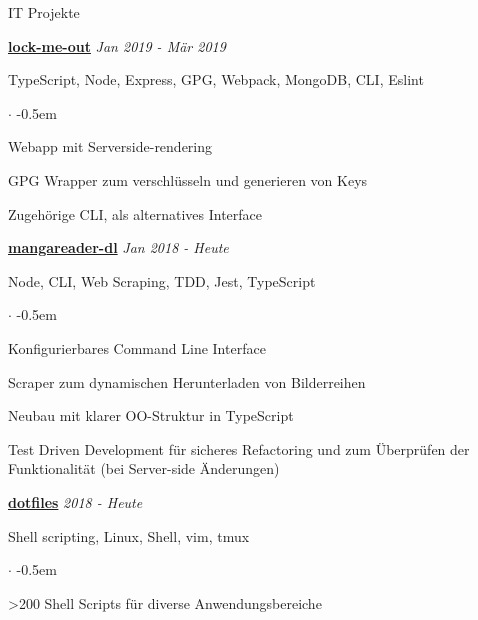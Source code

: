 \documentclass{cv}
\begin{document}
\begin{rSection}{IT Projekte}


  \textbf{\href{https://github.com/jneidel/lock-me-out}{lock-me-out}}
  \hfill
  {\em Jan 2019 - Mär 2019}

  TypeScript, Node, Express, GPG, Webpack, MongoDB, CLI, Eslint
  \begin{list}{$\cdot$}{}
    \itemsep -0.5em \vspace{-0.5em}
    \smallskip
    \item Webapp mit Serverside-rendering
    \item GPG Wrapper zum verschlüsseln und generieren von Keys
    \item Zugehörige CLI, als alternatives Interface
  \end{list}

  \textbf{\href{https://github.com/jneidel/mangareader-dl}{mangareader-dl}}
  \hfill
  {\em Jan 2018 - Heute}

  Node, CLI, Web Scraping, TDD, Jest, TypeScript
  \begin{list}{$\cdot$}{}
    \itemsep -0.5em \vspace{-0.5em}
    \smallskip
    \item Konfigurierbares Command Line Interface
    \item Scraper zum dynamischen Herunterladen von Bilderreihen
    \item Neubau mit klarer OO-Struktur in TypeScript
    \item Test Driven Development für sicheres Refactoring und zum Überprüfen der
  Funktionalität (bei Server-side Änderungen)
  \end{list}

  \textbf{\href{https://github.com/jneidel/dotfiles}{dotfiles}}
  \hfill
  {\em 2018 - Heute}

  Shell scripting, Linux, Shell, vim, tmux
  \begin{list}{$\cdot$}{}
    \itemsep -0.5em \vspace{-0.5em}
    \smallskip
    \item \textgreater200 Shell Scripts für diverse Anwendungsbereiche
  \end{list}


\end{rSection}
\end{document}
